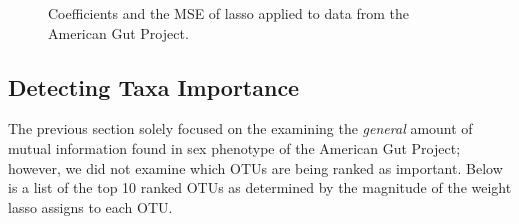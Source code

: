 \documentclass{acm_proc_article-sp}
\begin{document}
\begin{figure}
  \centering
  \caption{Coefficients and the MSE of lasso applied to data from the American Gut Project.}
  \label{fig:lasso}
\end{figure}


\subsection{Detecting Taxa Importance}
The previous section solely focused on the examining the {\em general} amount of mutual information found in sex phenotype of the American Gut Project; however, we did not examine which OTUs are being ranked as important. Below is a list of the top 10 ranked OTUs as determined by the magnitude of the weight lasso assigns to each OTU. 
\end{document}
